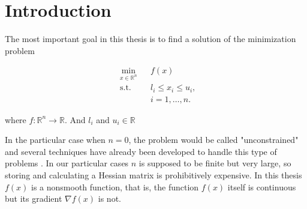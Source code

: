 
\chapter{Introduction} %

\label{Chapter1} %


The most important goal in this thesis is to find a solution of the minimization problem

\begin{equation} \label{mainproblem}
  \begin{aligned}
    & \underset{x \in \mathbb{R}^n}{\text{min}}
    & & f(x) \\
    & \text{s.t.}
    & & l_i \leq x_i \leq u_i , \; \\
    & & & i = 1, \ldots, n.
  \end{aligned}
\end{equation}

where $f \colon \mathbb{R}^n \to \mathbb{R}$.  And $l_i$ and $u_i \in \mathbb{R}$

In the particular case when $n = 0$, the problem would be called "unconstrained" and several techniques have already been developed to handle this type of problems \citep{unconstrained}.  In our particular cases $n$ is supposed to be finite but very large, so storing and calculating a Hessian matrix is prohibitively expensive.  In this thesis $f(x)$ is a nonsmooth function, that is, the function $f(x)$ itself is continuous but its gradient $\nabla f(x)$ is not.


